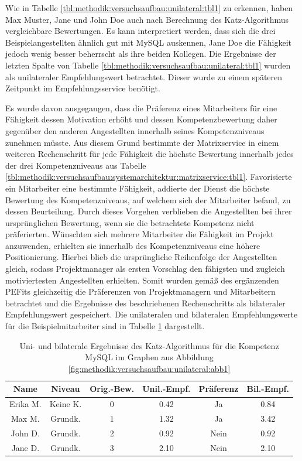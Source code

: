 Wie in Tabelle \ref{tbl:methodik:versuchsaufbau:unilateral:tbl1} zu erkennen, haben Max Muster, Jane und John Doe auch nach Berechnung des Katz-Algorithmus vergleichbare Bewertungen. Es kann interpretiert werden, dass sich die drei Beispielangestellten ähnlich gut mit MySQL auskennen, Jane Doe die Fähigkeit jedoch wenig besser beherrscht als ihre beiden Kollegen. Die Ergebnisse der letzten Spalte von Tabelle \ref{tbl:methodik:versuchsaufbau:unilateral:tbl1} wurden als unilateraler Empfehlungswert betrachtet. Dieser wurde zu einem späteren Zeitpunkt im Empfehlungsservice benötigt.

Es wurde davon ausgegangen, dass die Präferenz eines Mitarbeiters für eine Fähigkeit dessen Motivation erhöht und dessen Kompetenzbewertung daher gegenüber den anderen Angestellten innerhalb seines Kompetenzniveaus zunehmen müsste. Aus diesem Grund bestimmte der Matrixservice in einem weiteren Rechenschritt für jede Fähigkeit die höchste Bewertung innerhalb jedes der drei Kompetenzniveaus aus Tabelle \ref{tbl:methodik:versuchsaufbau:systemarchitektur:matrixservice:tbl1}. Favorisierte ein Mitarbeiter eine bestimmte Fähigkeit, addierte der Dienst die höchste Bewertung des Kompetenzniveaus, auf welchem sich der Mitarbeiter befand, zu dessen Beurteilung. Durch dieses Vorgehen verblieben die Angestellten bei ihrer ursprünglichen Bewertung, wenn sie die betrachtete Kompetenz nicht präferierten. Wünschten sich mehrere Mitarbeiter die Fähigkeit im Projekt anzuwenden, erhielten sie innerhalb des Kompetenzniveaus eine höhere Positionierung. Hierbei blieb die ursprüngliche Reihenfolge der Angestellten gleich, sodass Projektmanager als ersten Vorschlag den fähigsten und zugleich motiviertesten Angestellten erhielten. Somit wurden gemäß des ergänzenden \acp{PEFit} gleichzeitig die Präferenzen von Projektmanagern und Mitarbeitern betrachtet und die Ergebnisse des beschriebenen Rechenschritts als bilateraler Empfehlungswert gespeichert. Die unilateralen und bilateralen Empfehlungswerte für die Beispielmitarbeiter sind in Tabelle \ref{tbl:methodik:versuchsaufbau:unilateral:tbl3} dargestellt.

\begin{table}[h]
	\centering
	\begin{tabular}{c|c|c|c|c|c}
		\textbf{Name} & \textbf{Niveau} & \textbf{Orig.-Bew.} & \textbf{Unil.-Empf.} & \textbf{Präferenz} & \textbf{Bil.-Empf.}\\
		\hline
		\rowcolor{exxetagray}Erika M. & Keine K. & 0 & 0.42 & Ja   & 0.84\\
		\hline
		\rowcolor{itemcolor}Max M.    & Grundk.  & 1 & 1.32 & Ja   & 3.42\\
		\rowcolor{itemcolor}John D.   & Grundk.  & 2 & 0.92 & Nein & 0.92\\
		\rowcolor{itemcolor}Jane D.   & Grundk.  & 3 & 2.10 & Nein & 2.10
	\end{tabular}
	\caption{Uni- und bilaterale Ergebnisse des Katz-Algorithmus für die Kompetenz MySQL im Graphen aus Abbildung \ref{fig:methodik:versuchsaufbau:unilateral:abb1}}
	\label{tbl:methodik:versuchsaufbau:unilateral:tbl3}
\end{table}

